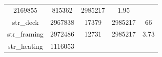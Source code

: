 \documentclass[]{book}
\theoremstyle{definition}
\theoremstyle{definition}
\theoremstyle{definition}
\theoremstyle{remark}
\begin{document}
\begin{longtable}[]{@{}ccccc@{}}
\begin{minipage}[t]{0.12\columnwidth}
2169855\strut
\end{minipage} & \begin{minipage}[t]{0.13\columnwidth}\centering\strut
815362\strut
\end{minipage} & \begin{minipage}[t]{0.12\columnwidth}\centering\strut
2985217\strut
\end{minipage} & \begin{minipage}[t]{0.12\columnwidth}\centering\strut
1.95\strut
\end{minipage}\tabularnewline
\begin{minipage}[t]{0.35\columnwidth}\centering\strut
str\_deck\strut
\end{minipage} & \begin{minipage}[t]{0.12\columnwidth}\centering\strut
2967838\strut
\end{minipage} & \begin{minipage}[t]{0.13\columnwidth}\centering\strut
17379\strut
\end{minipage} & \begin{minipage}[t]{0.12\columnwidth}\centering\strut
2985217\strut
\end{minipage} & \begin{minipage}[t]{0.12\columnwidth}\centering\strut
66\strut
\end{minipage}\tabularnewline
\begin{minipage}[t]{0.35\columnwidth}\centering\strut
str\_framing\strut
\end{minipage} & \begin{minipage}[t]{0.12\columnwidth}\centering\strut
2972486\strut
\end{minipage} & \begin{minipage}[t]{0.13\columnwidth}\centering\strut
12731\strut
\end{minipage} & \begin{minipage}[t]{0.12\columnwidth}\centering\strut
2985217\strut
\end{minipage} & \begin{minipage}[t]{0.12\columnwidth}\centering\strut
3.73\strut
\end{minipage}\tabularnewline
\begin{minipage}[t]{0.35\columnwidth}\centering\strut
str\_heating\strut
\end{minipage} & \begin{minipage}[t]{0.12\columnwidth}\centering\strut
1116053\strut
\end{minipage} & \begin{minipage}[t]{0.13\columnwidth}\centering\strut

\end{minipage}
\end{longtable}
\end{document}
